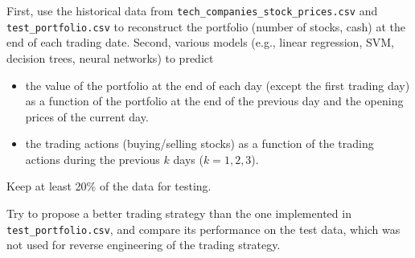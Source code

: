 \documentclass{article}
\begin{document}
First, use the historical data from \lstinline$tech_companies_stock_prices.csv$ and \lstinline$test_portfolio.csv$
to reconstruct the portfolio (number of stocks, cash) at the end of each trading date. Second, various models 
(e.g., linear regression, SVM, decision trees, neural networks) to predict 
\begin{itemize}
\item
    the value of the portfolio at the end of each day (except the first trading day) 
     as a function of the portfolio at the end of the previous day and the opening prices of the current day.
\item
    the trading actions (buying/selling stocks) as a function of the trading actions during the previous $k$ days ($k=1,2,3$).
\end{itemize}

Keep at least 20\% of the data for testing.

Try to propose a better trading strategy than the one implemented in \lstinline$test_portfolio.csv$, and compare its performance
on the test data, which was not used for reverse engineering of the trading strategy.
\end{document}
